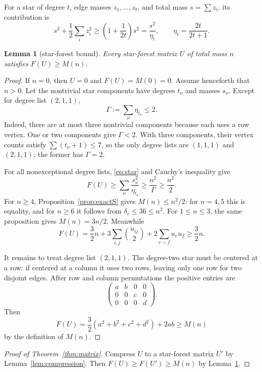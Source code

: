 \documentclass[11pt]{article}
\theoremstyle{plain}
\newtheorem{lemma}[theorem]{Lemma}
\theoremstyle{definition}
\theoremstyle{remark}
\newcommand{\1}{\mathbf 1}
\begin{document}
For a star of degree $t$, edge masses $z_1,\ldots,z_t$, and total mass
$s=\sum z_i$, its contribution is
\begin{equation}\label{eq:star}
 s^2+\frac12\sum_i z_i^2
 \geq\left(1+\frac1{2t}\right)s^2
 =\frac{s^2}{\eta_t},
 \qquad \eta_t=\frac{2t}{2t+1}.
\end{equation}

\begin{lemma}[star-forest bound]\label{lem:starforest}
Every star-forest matrix $U$ of total mass $n$ satisfies $F(U)\geq M(n)$.
\end{lemma}

\begin{proof}
If $n=0$, then $U=0$ and $F(U)=M(0)=0$.  Assume henceforth that $n>0$.
Let the nontrivial star components have degrees $t_\nu$ and masses $s_\nu$.
Except for degree list $(2,1,1)$,
\begin{equation}\label{eq:Gamma}
 \Gamma:=\sum_\nu\eta_{t_\nu}\leq2.
\end{equation}
Indeed, there are at most three nontrivial components because each uses a row
vertex.  One or two components give $\Gamma<2$.  With three components, their
vertex counts satisfy $\sum(t_\nu+1)\leq7$, so the only degree lists are
$(1,1,1)$ and $(2,1,1)$; the former has $\Gamma=2$.

For all nonexceptional degree lists, \eqref{eq:star} and Cauchy's inequality
give
\[
 F(U)\geq\sum_\nu\frac{s_\nu^2}{\eta_{t_\nu}}
 \geq\frac{n^2}{\Gamma}\geq\frac{n^2}{2}.
\]
For $n\geq4$, Proposition~\ref{prop:exactS} gives $M(n)\leq n^2/2$:
for $n=4,5$ this is equality, and for $n\geq6$ it follows from
$\delta_r\leq36\leq n^2$.  For $1\leq n\leq3$, the same proposition gives
$M(n)=3n/2$.  Meanwhile
\[
 F(U)=\frac32n+3\sum_{i,j}\binom{u_{ij}}2
 +2\sum_{e\sim f}u_eu_f\geq\frac32n.
\]

It remains to treat degree list $(2,1,1)$.  The degree-two star must be centered
at a row: if centered at a column it uses two rows, leaving only one row for
two disjoint edges.  After row and column permutations the positive entries
are
\[
 \begin{pmatrix}a&b&0&0\\0&0&c&0\\0&0&0&d\end{pmatrix}.
\]
Then
\[
 F(U)=\frac32(a^2+b^2+c^2+d^2)+2ab\geq M(n)
\]
by the definition of $M(n)$.
\end{proof}

\begin{proof}[Proof of Theorem~\ref{thm:matrix}]
Compress $U$ to a star-forest matrix $U'$ by Lemma~\ref{lem:compression}.
Then $F(U)\geq F(U')\geq M(n)$ by Lemma~\ref{lem:starforest}.
\end{proof}
\end{document}
